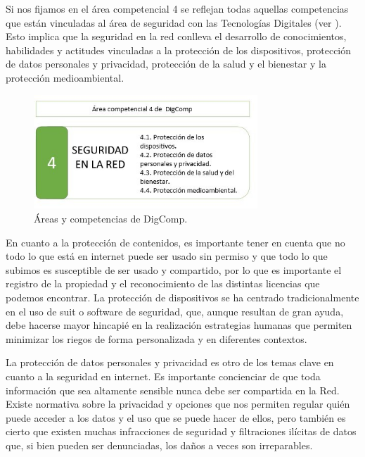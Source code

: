 \documentclass[spanish]{textolivre}
\begin{document}
Si nos fijamos en el área competencial 4 se reflejan todas aquellas competencias que están vinculadas al área de seguridad con las Tecnologías Digitales (ver ). Esto implica que la seguridad en la red conlleva el desarrollo de conocimientos, habilidades y actitudes vinculadas a la protección de los dispositivos, protección de datos personales y privacidad, protección de la salud y el bienestar y la protección medioambiental.

\begin{figure}[h!]
\centering
\begin{minipage}{0.75\textwidth}
\includegraphics[width=0.75\textwidth]{Fig2.jpeg}
\caption{Áreas y competencias de DigComp.}
\label{fig2}
\end{minipage}
\end{figure}

En cuanto a la protección de contenidos, es importante tener en cuenta que no todo lo que está en internet puede ser usado sin permiso y que todo lo que subimos es susceptible de ser usado y compartido, por lo que es importante el registro de la propiedad y el reconocimiento de las distintas licencias que podemos encontrar. La protección de dispositivos se ha centrado tradicionalmente en el uso de suit o software de seguridad, que, aunque resultan de gran ayuda, debe hacerse mayor hincapié en la realización estrategias humanas que permiten minimizar los riegos de forma personalizada y en diferentes contextos.

La protección de datos personales y privacidad es otro de los temas clave en cuanto a la seguridad en internet. Es importante concienciar de que toda información que sea altamente sensible nunca debe ser compartida en la Red. Existe normativa sobre la privacidad y opciones que nos permiten regular quién puede acceder a los datos y el uso que se puede hacer de ellos, pero también es cierto que existen muchas infracciones de seguridad y filtraciones ilícitas de datos que, si bien pueden ser denunciadas, los daños a veces son irreparables.
\end{document}
